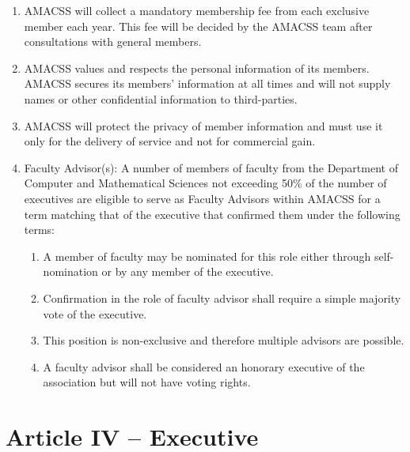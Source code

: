 \documentclass[12pt,a4paper]{article}
\begin{document}
\begin{enumerate}
\item AMACSS will collect a mandatory membership fee from each exclusive member each year. This fee will be decided by the AMACSS team after consultations with general members.

\item AMACSS values and respects the personal information of its members. AMACSS secures its members' information at all times and will not supply names or other confidential information to third-parties.

\item AMACSS will protect the privacy of member information and must use it only for the delivery of service and not for commercial gain.

\item Faculty Advisor(s): A number of members of faculty from the Department of Computer and Mathematical Sciences not exceeding 50\% of the number of executives are eligible to serve as Faculty Advisors within AMACSS for a term matching that of the executive that confirmed them under the following terms:

\begin{enumerate}
\item A member of faculty may be nominated for this role either through self-nomination or by any member of the executive.

\item Confirmation in the role of faculty advisor shall require a simple majority vote of the executive.

\item This position is non-exclusive and therefore multiple advisors are possible.

\item A faculty advisor shall be considered an honorary executive of the association but will not have voting rights.
\end{enumerate}
\end{enumerate}

\section*{Article IV – Executive}
\end{document}
